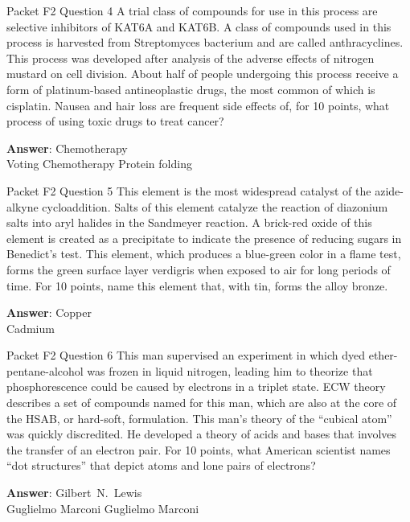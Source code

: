 \begin{frame}{Packet F2 Question 4}
A trial class of compounds for use in this process are selective   inhibitors of KAT6A and KAT6B. A class of compounds used in this process is harvested from Streptomyces bacterium and are called anthracyclines. This process was developed after analysis of the adverse effects of nitrogen mustard on cell division. About half of people undergoing this process receive a form of platinum-based antineoplastic drugs, the most common of which is cisplatin. Nausea and     hair loss are frequent side effects of, for 10 points, what process of using toxic drugs to treat cancer?    

\textbf{Answer}: Chemotherapy\\
 Voting
 Chemotherapy
 Protein folding
\end{frame}

\begin{frame}{Packet F2 Question 5}
This element is the most   widespread catalyst of the azide-alkyne cycloaddition. Salts   of this element   catalyze the reaction of diazonium salts   into aryl halides in the Sandmeyer reaction.   A brick-red oxide of this element is created as a precipitate to indicate the presence of reducing sugars in Benedict’s test. This element, which produces a blue-green color in a flame test, forms the green surface layer verdigris when exposed to air for long periods of time. For 10 points, name this element that, with tin, forms the alloy bronze.

\textbf{Answer}: Copper\\
 Cadmium
\end{frame}

\begin{frame}{Packet F2 Question 6}
This man supervised an     experiment in which dyed ether-pentane-alcohol was frozen in liquid nitrogen, leading him to theorize that phosphorescence could be caused by electrons in a triplet state. ECW theory describes a set of compounds named for   this man, which are also at the core of the HSAB, or hard-soft, formulation.   This man’s theory of the “cubical atom” was quickly discredited. He developed a theory of acids and bases that involves the transfer of an electron pair. For 10 points, what American scientist names “dot structures” that   depict atoms and lone   pairs of electrons?

\textbf{Answer}: Gilbert\ N.\ Lewis\\
 Guglielmo Marconi
 Guglielmo Marconi
\end{frame}

